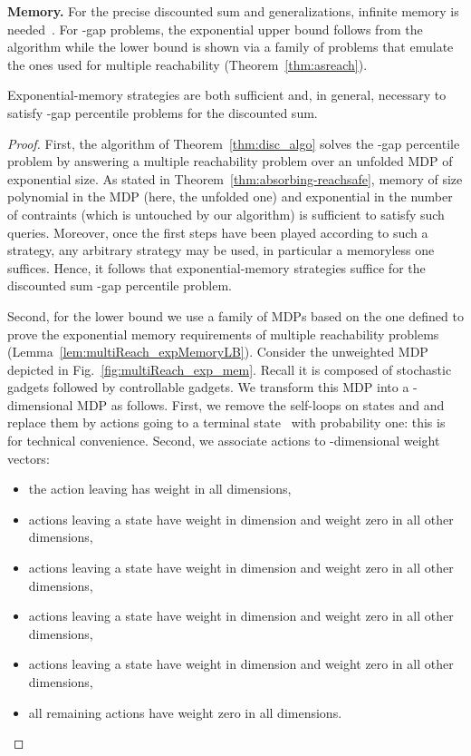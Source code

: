 \documentclass{llncs}
\begin{document}
\smallskip\noindent\textbf{Memory.} For the precise discounted sum and
generalizations, infinite memory is
needed~\cite{DBLP:conf/lpar/ChatterjeeFW13}. For -gap problems,
the exponential upper bound follows from the algorithm while the lower bound is
shown via a family of problems that emulate the ones used for multiple
reachability (Theorem~\ref{thm:asreach}). 

\begin{lemma}
\label{lem:ds_memory}
Exponential-memory strategies are both sufficient and, in general, necessary to satisfy -gap percentile problems for the discounted sum.
\end{lemma}

\begin{proof}
First, the algorithm of Theorem~\ref{thm:disc_algo} solves the -gap percentile problem by answering a multiple reachability problem over an unfolded MDP of exponential size. As stated in Theorem~\ref{thm:absorbing-reachsafe}, memory of size polynomial in the MDP (here, the unfolded one) and exponential in the number of contraints (which is untouched by our algorithm) is sufficient to satisfy such queries. Moreover, once the first  steps have been played according to such a strategy, any arbitrary strategy may be used, in particular a memoryless one suffices. Hence, it follows that exponential-memory strategies suffice for the discounted sum -gap percentile problem.

Second, for the lower bound we use a family of MDPs based on the one defined to prove the exponential memory requirements of multiple reachability problems (Lemma~\ref{lem:multiReach_expMemoryLB}). Consider the unweighted MDP depicted in Fig.~\ref{fig:multiReach_exp_mem}. Recall it is composed of  stochastic gadgets followed by  controllable gadgets. We transform this MDP into a -dimensional MDP  as follows. First, we remove the self-loops on states  and  and replace them by actions going to a terminal state~ with probability one: this is for technical convenience. Second, we associate actions to -dimensional weight vectors:
\begin{itemize}
\item the action leaving  has weight  in all  dimensions,
\item actions leaving a state  have weight  in dimension  and weight zero in all other dimensions,
\item actions leaving a state  have weight  in dimension  and weight zero in all other dimensions,
\item actions leaving a state  have weight  in dimension  and weight zero in all other dimensions,
\item actions leaving a state  have weight  in dimension  and weight zero in all other dimensions,
\item all remaining actions have weight zero in all dimensions.
\end{itemize}


\end{proof}
\end{document}
